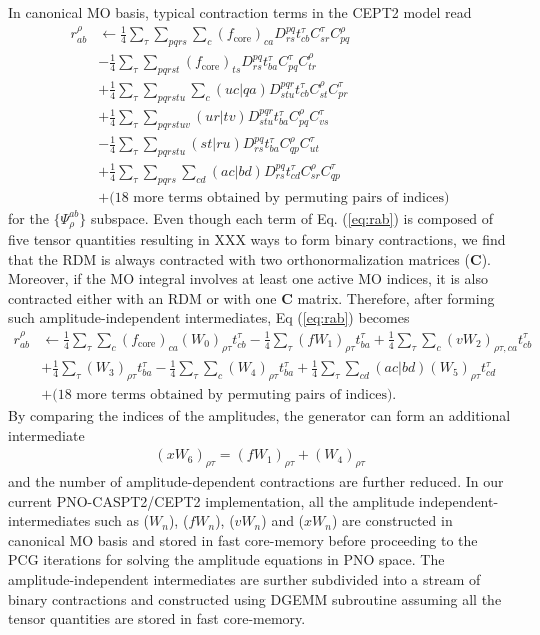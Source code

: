 \documentclass[aip,jcp,amsmath]{revtex4-1}
\begin{document}
%
In canonical MO basis, typical contraction terms in the CEPT2 model read
%
\begin{align}
  r_{ab}^\rho &\leftarrow \frac{1}{4}\sum_\tau\sum_{pqrs}\sum_{c}(f_\text{core})_{ca} D^{pq}_{rs} t_{cb}^\tau C_{sr}^\tau C_{pq}^\rho \nonumber \\
  &-\frac{1}{4}\sum_\tau\sum_{pqrst} (f_\text{core})_{ts} D^{pq}_{rs} t_{ba}^\tau C_{pq}^\tau C_{tr}^\rho \nonumber \\
  &+\frac{1}{4}\sum_\tau\sum_{pqrstu}\sum_c (uc|qa) D^{pqr}_{stu} t_{cb}^\tau C_{st}^\rho C_{pr}^\tau \nonumber \\
  &+\frac{1}{4}\sum_\tau\sum_{pqrstuv} (ur|tv) D^{pqr}_{stu} t_{ba}^\tau C_{pq}^\rho C_{vs}^\tau  \nonumber \\
  &-\frac{1}{4}\sum_\tau\sum_{pqrstu} (st|ru) D^{pq}_{rs} t_{ba}^\tau C_{qp}^\rho C_{ut}^\tau \nonumber \\
  &+\frac{1}{4}\sum_\tau\sum_{pqrs}\sum_{cd} (ac|bd) D^{pq}_{rs} t_{cd}^\tau C_{sr}^\rho C_{qp}^\tau \nonumber \\
  &+\text{(18 more terms obtained by permuting pairs of indices)} \label{eq:rab}
\end{align}
%
for the $\{\Psi_{\rho}^{ab}\}$ subspace.
%
Even though each term of Eq. (\ref{eq:rab}) is composed of five tensor quantities resulting in XXX ways to form binary contractions, we find that the RDM is always contracted with two orthonormalization matrices ($\mathbf{C}$).
%
Moreover, if the MO integral involves at least one active MO indices, it is also contracted either with an RDM or with one $\mathbf{C}$ matrix.
%
Therefore, after forming such amplitude-independent intermediates, Eq (\ref{eq:rab}) becomes
%
\begin{align}
  r_{ab}^\rho &\leftarrow \frac{1}{4}\sum_\tau\sum_{c}(f_\text{core})_{ca} (W_0)_{\rho\tau} t_{cb}^\tau - \frac{1}{4}\sum_\tau (fW_1)_{\rho\tau} t_{ba}^\tau +\frac{1}{4}\sum_\tau\sum_c (vW_2)_{\rho\tau,ca} t_{cb}^\tau \nonumber \\
  &+\frac{1}{4}\sum_\tau (W_3)_{\rho\tau} t_{ba}^\tau-\frac{1}{4}\sum_\tau\sum_c (W_4)_{\rho\tau} t_{ba}^\tau +\frac{1}{4}\sum_\tau\sum_{cd} (ac|bd) (W_5)_{\rho\tau} t_{cd}^\tau \nonumber \\
  &+\text{(18 more terms obtained by permuting pairs of indices)}. \label{eq:rab-2}
\end{align}
%
By comparing the indices of the amplitudes, the generator can form an additional intermediate
%
\begin{align}
  (xW_6)_{\rho\tau}=(fW_1)_{\rho\tau}+(W_4)_{\rho\tau} \label{eq:interm}
\end{align}
%
and the number of amplitude-dependent contractions are further reduced.
%
In our current PNO-CASPT2/CEPT2 implementation, all the amplitude independent-intermediates such as ($W_n$), ($fW_n$), ($vW_n$) and ($xW_n$) are constructed in canonical MO basis and stored in fast core-memory before proceeding to the PCG iterations for solving the amplitude equations in PNO space.
%
The amplitude-independent intermediates are surther subdivided into a stream of binary contractions and constructed using DGEMM subroutine assuming all the tensor quantities are stored in fast core-memory.
\end{document}
